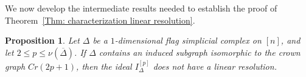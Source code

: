 \documentclass[12pt]{amsart}
\newtheorem{Proposition}[Theorem]{Proposition}
\begin{document}

We now develop the intermediate results needed to establish the proof of Theorem~\ref{Thm: characterization linear resolution}.

\begin{Proposition}\label{Prop: Crown implies no linear}
Let $\Delta$ be a $1$-dimensional flag simplicial complex on $[n]$, and let
$2 \leq p \leq \nu(\overline{\Delta})$.
If $\Delta$ contains an induced subgraph isomorphic to the crown graph $Cr(2p+1)$, then the ideal $I_{\Delta}^{[p]}$ does not have a linear resolution.
\end{Proposition}
\end{document}
